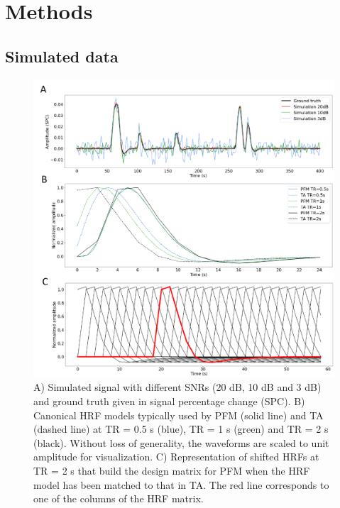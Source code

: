 
\section{Methods}
\label{sec:data}

\subsection{Simulated data}

\begin{figure}[t!]
    \begin{center}
        \includegraphics[width=0.75\columnwidth]{figures/sim_and_hrf.pdf}
    \end{center}
    \caption{A) Simulated signal with different SNRs (20 dB, 10 dB and 3 dB) and ground truth given in signal percentage change (SPC). B) Canonical HRF models typically used by PFM (solid line) and TA (dashed line) at TR = 0.5 s (blue), TR = 1 s (green) and TR = 2 s (black). Without loss of generality, the waveforms are scaled to unit amplitude for visualization. C) Representation of shifted HRFs at TR = 2 s that build the design matrix for PFM when the HRF model has been matched to that in TA. The red line corresponds to one of the columns of the HRF matrix.}
\label{fig:sim_and_hrf}
\end{figure}

